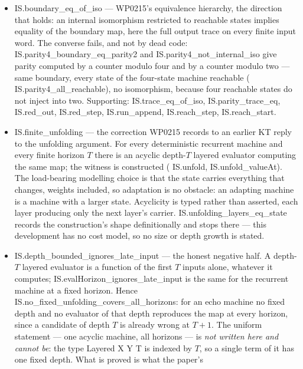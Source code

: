\documentclass[11pt,a4paper]{article}
\newcommand{\lean}[1]{{\ttfamily\small
  \let\leanunderscore\_\def\_{\leanunderscore\allowbreak}#1}}
\newcommand{\Ik}{\mathrm{I}_K}
\begin{document}
\begin{itemize}[leftmargin=1.4em,itemsep=1pt]
\lean{IS.equal\_complexity\_is\_not\_shared\_information} exhibits two descriptions of equal
complexity with $\Ik=0$, so equal description length is not a weak form of the hypothesis.
\item \lean{IS.boundary\_eq\_of\_iso} --- WP0215's equivalence hierarchy, the direction that
holds: an internal isomorphism restricted to reachable states implies equality of the boundary
map, here the full output trace on every finite input word. The converse fails, and not by dead
code: \lean{IS.parity4\_boundary\_eq\_parity2} and \lean{IS.parity4\_not\_internal\_iso} give
parity computed by a counter modulo four and by a counter modulo two --- same boundary, every
state of the four-state machine reachable (\lean{IS.parity4\_all\_reachable}), no isomorphism,
because four reachable states do not inject into two. Supporting:
\lean{IS.trace\_eq\_of\_iso}, \lean{IS.parity\_trace\_eq}, \lean{IS.red\_out},
\lean{IS.red\_step}, \lean{IS.run\_append}, \lean{IS.reach\_step}, \lean{IS.reach\_start}.
\item \lean{IS.finite\_unfolding} --- the correction WP0215 records to an earlier KT reply to
the unfolding argument. For every deterministic recurrent machine and every finite horizon $T$
there is an acyclic depth-$T$ layered evaluator computing the same map; the witness is
constructed (\lean{IS.unfold}, \lean{IS.unfold\_valueAt}). The load-bearing modelling choice is
that the state carries everything that changes, weights included, so adaptation is no obstacle:
an adapting machine is a machine with a larger state. Acyclicity is typed rather than asserted,
each layer producing only the next layer's carrier. \lean{IS.unfolding\_layers\_eq\_state}
records the construction's shape definitionally and stops there --- this development has no cost
model, so no size or depth growth is stated.
\item \lean{IS.depth\_bounded\_ignores\_late\_input} --- the honest negative half. A depth-$T$
layered evaluator is a function of the first $T$ inputs alone, whatever it computes;
\lean{IS.evalHorizon\_ignores\_late\_input} is the same for the recurrent machine at a fixed
horizon. Hence \lean{IS.no\_fixed\_unfolding\_covers\_all\_horizons}: for an echo machine no
fixed depth and no evaluator of that depth reproduces the map at every horizon, since a
candidate of depth $T$ is already wrong at $T+1$. The uniform statement --- one acyclic machine,
all horizons --- is \emph{not written here and cannot be}: the type \lean{Layered X Y T} is
indexed by $T$, so a single term of it has one fixed depth. What is proved is what the paper's

\end{itemize}
\end{document}
